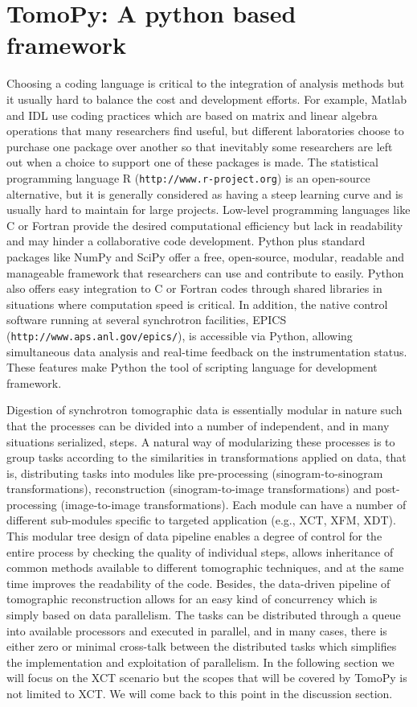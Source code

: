 \documentclass[pdf]{iucr}              %
\begin{document}
\section{TomoPy: A python based framework}

Choosing a coding language is critical to the integration of analysis methods but it usually hard to balance the cost and development efforts. For example, Matlab and IDL use coding practices which are based on matrix and linear algebra operations that many researchers find useful, but different laboratories choose to purchase one package over another so that inevitably some researchers are left out when a choice to support one of these packages is made. The statistical programming language R (\texttt{http://www.r-project.org}) is an open-source alternative, but it is generally considered as having a steep learning curve and is usually hard to maintain for large projects. Low-level programming languages like C or Fortran provide the desired computational efficiency but lack in readability and may hinder a collaborative code development. Python plus standard packages like NumPy and SciPy offer a free, open-source, modular, readable and manageable framework that researchers can use and contribute to easily.  Python also offers easy integration to C or Fortran codes through shared libraries in situations where computation speed is critical.  In addition, the native  control software running at several synchrotron facilities, EPICS (\texttt{http://www.aps.anl.gov/epics/}), is accessible via Python, allowing simultaneous data analysis and real-time feedback on the instrumentation status. These features make Python the tool of scripting language for development framework.

Digestion of synchrotron tomographic data is essentially modular in nature such that the processes can be divided into a number of independent, and in many situations serialized, steps. A natural way of modularizing these processes is to group tasks according to the similarities in transformations applied on data, that is, distributing tasks into modules like pre-processing (sinogram-to-sinogram transformations), reconstruction (sinogram-to-image transformations) and post-processing (image-to-image transformations). Each module can have a number of different sub-modules specific to targeted application (e.g., XCT, XFM, XDT). This  modular tree design of data pipeline enables a degree of control for the entire process by checking the quality of individual steps, allows inheritance of common methods available to different tomographic techniques, and at the same time improves the readability of the code. Besides, the data-driven pipeline of tomographic reconstruction allows for an easy kind of concurrency which is simply based on data parallelism. The tasks can be distributed through a queue into available processors and executed in parallel, and in many cases, there is either zero or minimal cross-talk between the distributed tasks which simplifies the implementation and exploitation of parallelism. In the following section we will focus on the XCT scenario but the scopes that will be covered by TomoPy is not limited to XCT. We will come back to this point in the discussion section.
\end{document}
